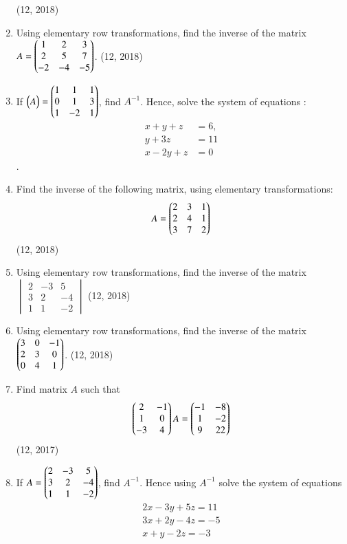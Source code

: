 \begin{enumerate}[label=\thesubsection.\arabic*,ref=\thesubsection.\theenumi]
\hfill (12, 2018)
\item Using elementary row transformations, find the inverse of the matrix $A=\begin{pmatrix}1 & 2 & 3 \\ 2 & 5 & 7 \\ -2 & -4 & -5\end{pmatrix}$.
\hfill (12, 2018)
\item If $\begin{pmatrix}A\end{pmatrix} = \begin{pmatrix}1&1&1\\0&1&3\\1&-2&1\end{pmatrix}$, find $A^{-1}$.
Hence, solve the system of equations :
\begin{align*}
    x+y+z&=6 ,\\
    y+3z&=11 \\
    x-2y+z&= 0
\end{align*}.
\item Find the inverse of the following matrix, using elementary transformations:
 \begin{align*}
 A=\begin{pmatrix} 2 & 3 & 1\\ 2 & 4 & 1\\3 & 7 & 2 \end{pmatrix}
 \end{align*}
\hfill (12, 2018)
\item Using elementary row transformations, find the inverse of the matrix 
$\begin{vmatrix}
    2 & -3 & 5\\
    3 & 2 & -4 \\
    1 & 1 & -2
\end{vmatrix}$
\hfill (12, 2018)
\item Using elementary row transformations, find the inverse of the matrix $\begin{pmatrix}3 & 0 & -1\\
	2 & 3 & 0\\
	0 & 4 & 1\\\end{pmatrix}$.
\hfill (12, 2018)
\item Find matrix $A$ such that
\begin{align*}
   \begin{pmatrix}2 & -1 \\1 & 0 \\-3 & 4\end{pmatrix} A=\begin{pmatrix}-1 & -8 \\1 & -2 \\9 & 22\end{pmatrix} 
\end{align*} 
\hfill (12, 2017)
 \item If $A=\begin{pmatrix}2 & -3 & 5\\3 & 2 & -4\\1 & 1 & -2\end{pmatrix}$, find $A^{-1}$. Hence using $A^{-1}$ solve the system of equations \begin{align*}
    2x-3y+5z=11\\3x+2y-4z=-5\\x+y-2z=-3

\end{align*}
\end{enumerate}
